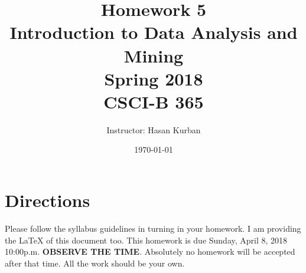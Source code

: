 \documentclass{article}
\begin{document}
\title{Homework 5\\ Introduction to Data Analysis and Mining \\ Spring 2018\\ CSCI-B 365}         %
\author{Instructor: Hasan Kurban}        %
\date{\today}          %
\maketitle
\makeatother     %
\pagestyle{plain}
\section*{Directions}
Please follow the syllabus guidelines in turning in your homework.  I am providing the \LaTeX{} of this document too. This homework is due Sunday, April 8, 2018 10:00p.m. \textbf{OBSERVE THE  TIME}. Absolutely no homework will be accepted after that time. All the work should be your own.  



 
 
 
\end{document}
